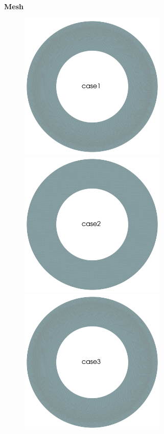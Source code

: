 \documentclass[12pt]{article}
\numberwithin{equation}{subsection}
\begin{document}
\vspace{1.2in}
\textbf{Mesh}
\begin{figure}[!htb]
	
	\begin{multicols}{4}
		\includegraphics[width=7cm]{./case1/mesh.png}\par
		\hspace{0.75in}
		\includegraphics[width=7cm]{./case2/mesh.png}\par
		\hspace{1.5in}
		\includegraphics[width=7cm]{./case3/mesh.png}\par

\end{multicols}
\end{figure}
\end{document}
